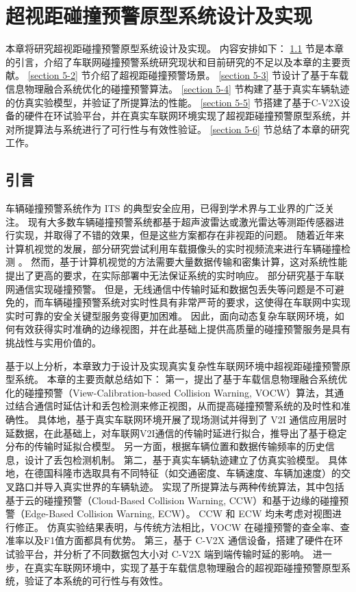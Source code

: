 \chapter[超视距碰撞预警原型系统设计及实现]{超视距碰撞预警原型系统设计及实现}
\removelofgap
\removelotgap
本章将研究超视距碰撞预警原型系统设计及实现。
内容安排如下：
\ref{section 5-1} 节是本章的引言，介绍了车联网碰撞预警系统研究现状和目前研究的不足以及本章的主要贡献。
\ref{section 5-2} 节介绍了超视距碰撞预警场景。
\ref{section 5-3} 节设计了基于车载信息物理融合系统优化的碰撞预警算法。
\ref{section 5-4} 节构建了基于真实车辆轨迹的仿真实验模型，并验证了所提算法的性能。
\ref{section 5-5} 节搭建了基于C-V2X设备的硬件在环试验平台，并在真实车联网环境实现了超视距碰撞预警原型系统，并对所提算法与系统进行了可行性与有效性验证。
\ref{section 5-6} 节总结了本章的研究工作。

\section{引言}\label{section 5-1}

车辆碰撞预警系统作为 ITS 的典型安全应用，已得到学术界与工业界的广泛关注。
现有大多数车辆碰撞预警系统都基于超声波雷达或激光雷达等测距传感器进行实现\cite{song2018real, wu2019series}，并取得了不错的效果，但是这些方案都存在非视距的问题。
随着近年来计算机视觉的发展，部分研究尝试利用车载摄像头的实时视频流来进行车辆碰撞检测 \cite{wang2016vision, song2018lane}。
然而，基于计算机视觉的方法需要大量数据传输和密集计算，这对系统性能提出了更高的要求，在实际部署中无法保证系统的实时响应。 
部分研究基于车联网通信实现碰撞预警\cite{hafner2013cooperative, gelbal2017elastic}。
但是，无线通信中传输时延和数据包丢失等问题是不可避免的，而车辆碰撞预警系统对实时性具有非常严苛的要求，这使得在车联网中实现实时可靠的安全关键型服务变得更加困难。
因此，面向动态复杂车联网环境，如何有效获得实时准确的边缘视图，并在此基础上提供高质量的碰撞预警服务是具有挑战性与实用价值的。

基于以上分析，本章致力于设计及实现真实复杂性车联网环境中超视距碰撞预警原型系统。
本章的主要贡献总结如下：
第一，提出了基于车载信息物理融合系统优化的碰撞预警（View-Calibration-based Collision Warning, VOCW）算法，其通过结合通信时延估计和丢包检测来修正视图，从而提高碰撞预警系统的及时性和准确性。
具体地，基于真实车联网环境开展了现场测试并得到了 V2I 通信应用层时延数据，在此基础上，对车联网V2I通信的传输时延进行拟合，推导出了基于稳定分布的传输时延拟合模型。
另一方面，根据车辆位置和数据传输频率的历史信息，设计了丢包检测机制。
第二，基于真实车辆轨迹建立了仿真实验模型。
具体地，在德国科隆市选取具有不同特征（如交通密度、车辆速度、车辆加速度）的交叉路口并导入真实世界的车辆轨迹。
实现了所提算法与两种传统算法，其中包括基于云的碰撞预警（Cloud-Based Collision Warning, CCW）和基于边缘的碰撞预警（Edge-Based Collision Warning, ECW）。
CCW 和 ECW 均未考虑对视图进行修正。
仿真实验结果表明，与传统方法相比，VOCW 在碰撞预警的查全率、查准率以及F1值方面都具有优势。
第三，基于 C-V2X 通信设备，搭建了硬件在环试验平台，并分析了不同数据包大小对 C-V2X 端到端传输时延的影响。
进一步，在真实车联网环境中，实现了基于车载信息物理融合的超视距碰撞预警原型系统，验证了本系统的可行性与有效性。

